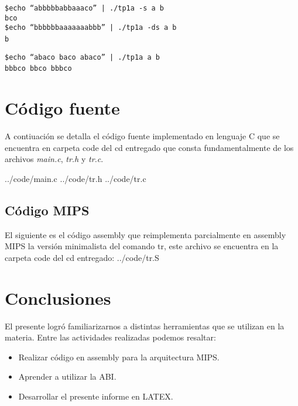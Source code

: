 \documentclass[a4paper,10pt]{article}
\begin{document}
\indent\texttt{\$echo ``abbbbbabbaaaco'' | ./tp1a -s a b}\\
\indent\texttt{bco}\\

\indent\texttt{\$echo ``bbbbbbaaaaaaabbb'' | ./tp1a -ds a b}\\
\indent\texttt{b}\

\indent\texttt{\$echo ``abaco baco abaco'' | ./tp1a a b}\\
\indent\texttt{bbbco bbco bbbco}\

\newpage
\newpage

\section{C\'{o}digo fuente}
A contiuaci\'{o}n se detalla el c\'{o}digo fuente implementado en lenguaje C que se encuentra en carpeta code del cd entregado 
que consta fundamentalmente de los archivos \textit{main.c}, \textit{tr.h} y \textit{tr.c}.

\lstset{basicstyle=\scriptsize, commentstyle=\textit, numbers=left, numberstyle=\footnotesize, tabsize=4, breaklines=true}
\lstset{language=C} 
\lstset{extendedchars=false} 
 {../code/main.c}
 {../code/tr.h}
 {../code/tr.c}

\newpage
\newpage

\subsection{C\'{o}digo MIPS}
El siguiente es el c\'{o}digo assembly que reimplementa parcialmente en assembly MIPS la versi\'{o}n minimalista del comando tr,
este archivo se encuentra en la carpeta code del cd entregado:
\lstset{basicstyle=\scriptsize, commentstyle=\textit, numbers=left, numberstyle=\footnotesize, tabsize=4, breaklines=true}
\lstset{language=C} 
\lstset{extendedchars=false} 
 {../code/tr.S}

\newpage
\newpage

\section{Conclusiones}
El presente logr\'{o} familiarizarnos a distintas herramientas que se utilizan en la materia.
Entre las actividades realizadas podemos resaltar:

\begin{itemize}
\item Realizar c\'{o}digo en assembly para la arquitectura MIPS.
\item Aprender a utilizar la ABI.
\item Desarrollar el presente informe en LATEX.
\end{itemize}
\end{document}
